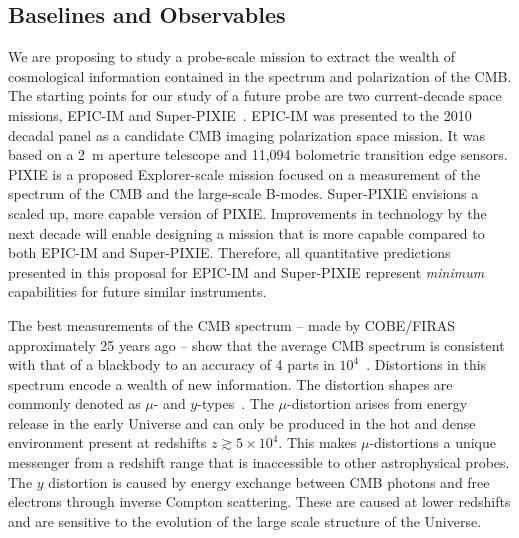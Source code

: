 
\subsection{Baselines and Observables}
\label{sec:observables}

\vspace{-0.05in}

We are proposing to study a probe-scale mission to extract the wealth 
of cosmological information contained in the spectrum and polarization of the \ac{CMB}. 
The starting points for our study of a future probe are two current-decade space missions, 
EPIC-IM and Super-PIXIE~\cite{epic_im, pixie}. EPIC-IM was presented 
to the 2010 decadal panel as a candidate \ac{CMB} imaging polarization space mission. 
It was based on a 2~m aperture telescope and 11,094 bolometric transition edge sensors. 
PIXIE is a proposed Explorer-scale mission focused on a measurement of the spectrum of the CMB and the large-scale B-modes. Super-PIXIE envisions a scaled up, 
more capable version of PIXIE. Improvements in technology by the next decade will enable designing a mission 
that is more capable compared to both EPIC-IM and Super-PIXIE. Therefore, all quantitative predictions presented in 
this proposal for EPIC-IM and Super-PIXIE represent {\it minimum} capabilities for future similar instruments. 

The best measurements of the \ac{CMB} spectrum -- made by COBE/FIRAS approximately 25 years ago --
show that the average CMB spectrum is consistent with that of a blackbody to an accuracy of 4 parts 
in $10^{4}$~\cite{Mather1994, Fixsen1996}. Distortions in this spectrum encode a wealth of new information.
The distortion shapes are commonly denoted as $\mu$- and $y$-types~\cite{Zeldovich1969, Sunyaev1970mu}. The 
$\mu$-distortion arises from energy release in the early Universe and can only be produced in the hot and dense 
environment present at redshifts $z\gtrsim 5\times10^4$. This makes $\mu$-distortions a unique messenger from a redshift 
range that is inaccessible to other astrophysical probes. The $y$ distortion is caused by 
energy exchange between \ac{CMB} photons and free electrons through inverse Compton 
scattering. These are caused at lower redshifts and are sensitive to the 
evolution of the large scale structure of the Universe. 

